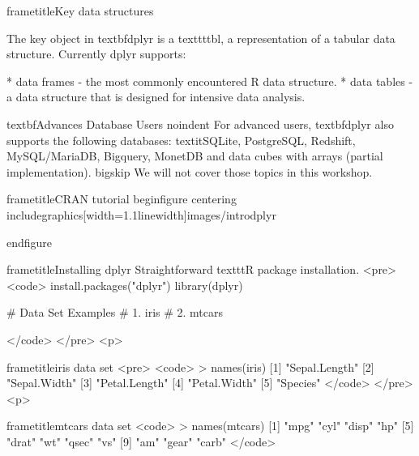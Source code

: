 		frametitle{Key data structures}
		
		The key object in textbf{dplyr} is a texttt{tbl}, a representation of a tabular data structure. Currently dplyr supports:
		
		
			         * data frames - the  most commonly encountered R data structure. 
			         * data tables - a data structure that is designed for intensive data analysis.
		
		
	
	
		textbf{Advances Database Users}
		noindent For advanced users, textbf{dplyr} also supports the following databases: textit{SQLite, PostgreSQL, Redshift, MySQL/MariaDB, Bigquery, MonetDB} and data cubes with arrays (partial implementation). bigskip We will not cover those topics in this workshop.
	
	
		frametitle{CRAN tutorial}
begin{figure}
centering
includegraphics[width=1.1linewidth]{images/introdplyr}

end{figure}

		
	
	
		frametitle{Installing dplyr}
		Straightforward texttt{R} package installation.
		<pre>
			<code>
			install.packages("dplyr")
			library(dplyr)
			
			# Data Set Examples
			# 1. iris
			# 2. mtcars
			
			</code>
		</pre>
<p>
	
	
	
		frametitle{iris data set}
		<pre>
			<code>
			> names(iris)
			[1] "Sepal.Length"
			[2] "Sepal.Width" 
			[3] "Petal.Length"
			[4] "Petal.Width" 
			[5] "Species"    
			</code>
		</pre>
<p>
	
	
	
		frametitle{mtcars data set}
		<code>
		> names(mtcars)
		[1] "mpg"  "cyl"  "disp" "hp"  
		[5] "drat" "wt"   "qsec" "vs"  
		[9] "am"   "gear" "carb"
		</code>
	
